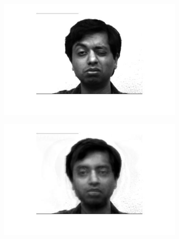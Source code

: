 \documentclass[a4paper]{iacas}
\begin{document}
\begin{figure}[!htbp]
	\begin{subfigure}[b]{0.4\textwidth}
		\includegraphics[width=\textwidth]{4152.jpg}
		\caption{}
		\label{fig:4152}
	\end{subfigure}
	\begin{subfigure}[b]{0.4\textwidth}
		\includegraphics[width=\textwidth]{4151.jpg}
		\caption{}
		\label{fig:4151}
	\end{subfigure}
	

\end{figure}
\end{document}
